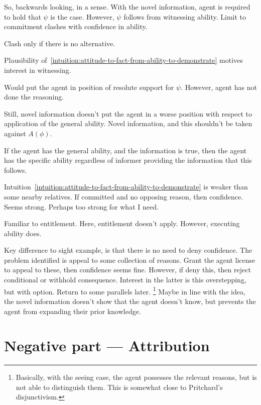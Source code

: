 \documentclass[10pt]{article}
\newcommand{\hozlinedash}[0]{%
  \noindent\hdashrule[0.5ex][c]{\textwidth}{.1pt}{2.5pt}
}
\begin{document}
\begin{note}
  So, backwards looking, in a sense.
  With the novel information, agent is required to hold that \(\psi\) is the case.
  However, \(\psi\) follows from witnessing ability.
  Limit to commitment clashes with confidence in ability.

  Clash only if there is no alternative.

  Plausibility of~\ref{intuition:attitude-to-fact-from-ability-to-demonstrate} motives interest in witnessing.

  Would put the agent in position of resolute support for \(\psi\).
  However, agent has not done the reasoning.

  Still, novel information doesn't put the agent in a worse position with respect to application of the general ability.
  Novel information, and this shouldn't be taken against \(A(\phi)\).

  If the agent has the general ability, and the information is true, then the agent has the specific ability regardless of informer providing the information that this follows.

  \hozlinedash

  Intuition~\ref{intuition:attitude-to-fact-from-ability-to-demonstrate} is weaker than some nearby relatives.
  If committed and no opposing reason, then confidence.
  Seems strong.
  Perhaps too strong for what I need.

  Familiar to entitlement.
  Here, entitlement doesn't apply.
  However, executing ability does.

  Key difference to sight example, is that there is no need to deny confidence.
  The problem identified is appeal to some collection of reasons.
  Grant the agent license to appeal to these, then confidence seems fine.
  However, if deny this, then reject conditional or withhold consequence.
  {
    \color{red}
    Interest in the latter is this overstepping, but with option.
    Return to some parallels later.\nolinebreak
    \footnote{
      Basically, with the seeing case, the agent possesses the relevant reasons, but is not able to distinguish them.
      This is somewhat close to Pritchard's disjunctivism.
    }
  }
  Maybe in line with the \citeauthor{Harman:1973ww} idea, the novel information doesn't show that the agent doesn't know, but prevents the agent from expanding their prior knowledge.
\end{note}



\hozlinedash

\section{Negative part --- Attribution}
\label{sec:negative-part}
\end{document}
